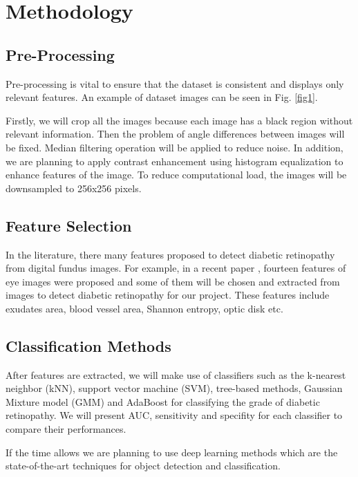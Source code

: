 \documentclass[letterpaper,11pt]{article}
\begin{document}
\section{Methodology}

\subsection{Pre-Processing}

\hspace{13pt} Pre-processing is vital to ensure that the dataset is consistent and displays only relevant features. An example of dataset images can be seen in Fig. \ref{fig1}.

Firstly, we will crop all the images because each image has a black region without relevant information. Then the problem of angle differences between images will be fixed. Median filtering operation will be applied to reduce noise. In addition, we are planning to apply contrast enhancement using histogram equalization to enhance features of the image. To reduce computational load, the images will be downsampled to 256x256 pixels.

\subsection{Feature Selection}

\hspace{13pt} In the literature, there many features proposed to detect diabetic retinopathy from digital fundus images. For example, in a recent paper \cite{art5}, fourteen features of eye images were proposed and some of them will be chosen and extracted from images to detect diabetic retinopathy for our project. These features include exudates area, blood vessel area, Shannon entropy, optic disk etc. 

\subsection{Classification Methods}
\hspace{13pt} After features are extracted, we will make use of classifiers such as the k-nearest neighbor (kNN), support vector machine (SVM), tree-based methods, Gaussian Mixture model (GMM) and AdaBoost for classifying the grade of diabetic retinopathy. We will present AUC, sensitivity and specifity for each classifier to compare their performances.

If the time allows we are planning to use deep learning methods which are the state-of-the-art techniques for object detection and classification. 
\end{document}
